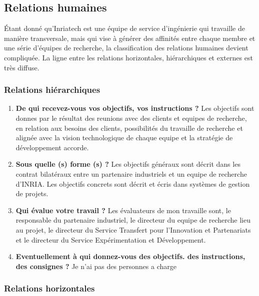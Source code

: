 \documentclass{resume} %
\begin{document}
	\subsection{Relations humaines}
	Étant donné qu'Inriatech est une équipe de service d'ingénierie qui travaille de manière transversale, mais qui vise à générer des affinités entre chaque membre et une série d'équipes de recherche, la classification des relations humaines devient compliquée. La ligne entre les relations horizontales, hiérarchiques et externes est très diffuse.
	
		\subsubsection {Relations hiérarchiques}
		\begin{enumerate}
			\item \textbf{De qui recevez-vous vos objectifs, vos instructions ?}
				Les objectifs sont donnes par le résultat des reunions avec des clients et equipes de recherche, en relation aux besoins des clients, possibilités du travaille de recherche et alignée avec la vision technologique de chaque equipe et la stratégie de développement accorde.
		\item \textbf{Sous quelle (s) forme (s) ?}
				Les objectifs généraux sont décrit dans les contrat bilatéraux entre un partenaire industriels et un equipe de recherche d'INRIA. 
				Les objectifs concrets sont décrit et écris dans systèmes de gestion de projets. 
		\item \textbf{Qui évalue votre travail ?}
				Les évaluateurs de mon travaille sont, le responsable du partenaire industriel, le directeur du equipe de recherche lieu au projet, le directeur du Service Transfert pour l'Innovation et Partenariats et le directeur du Service Expérimentation et Développement. 
		\item  \textbf{Eventuellement à qui donnez-vous des objectifs. des instructions, des consignes ?}
			Je n'ai pas des personnes a charge 
		\end{enumerate}

	\subsubsection {Relations horizontales } 
	
\end{document}

